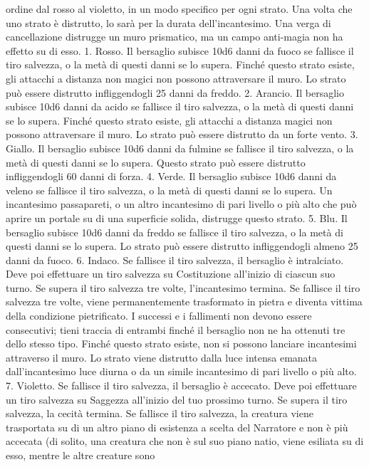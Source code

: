 \begin{multicols}{2}
ordine dal rosso al violetto, in un modo specifico per
ogni strato. Una volta che uno strato è distrutto, lo sarà
per la durata dell’incantesimo. Una verga di
cancellazione distrugge un muro prismatico, ma un
campo anti-magia non ha effetto su di esso.
1. Rosso. Il bersaglio subisce 10d6 danni da fuoco se
fallisce il tiro salvezza, o la metà di questi danni se lo
supera. Finché questo strato esiste, gli attacchi a
distanza non magici non possono attraversare il muro. 
Lo strato può essere distrutto infliggendogli 25 danni da
freddo.
2. Arancio. Il bersaglio subisce 10d6 danni da acido se
fallisce il tiro salvezza, o la metà di questi danni se lo
supera. Finché questo strato esiste, gli attacchi a
distanza magici non possono attraversare il muro. Lo
strato può essere distrutto da un forte vento.
3. Giallo. Il bersaglio subisce 10d6 danni da fulmine se
fallisce il tiro salvezza, o la metà di questi danni se lo
supera. Questo strato può essere distrutto infliggendogli
60 danni di forza.
4. Verde. Il bersaglio subisce 10d6 danni da veleno se
fallisce il tiro salvezza, o la metà di questi danni se lo
supera. Un incantesimo passapareti, o un altro
incantesimo di pari livello o più alto che può aprire un
portale su di una superficie solida, distrugge questo
strato.
5. Blu. Il bersaglio subisce 10d6 danni da freddo se
fallisce il tiro salvezza, o la metà di questi danni se lo
supera. Lo strato può essere distrutto infliggendogli
almeno 25 danni da fuoco.
6. Indaco. Se fallisce il tiro salvezza, il bersaglio è
intralciato. Deve poi effettuare un tiro salvezza su
Costituzione all’inizio di ciascun suo turno. Se supera il
tiro salvezza tre volte, l’incantesimo termina. Se fallisce
il tiro salvezza tre volte, viene permanentemente
trasformato in pietra e diventa vittima della condizione
pietrificato. I successi e i fallimenti non devono essere
consecutivi; tieni traccia di entrambi finché il bersaglio
non ne ha ottenuti tre dello stesso tipo.
Finché questo strato esiste, non si possono lanciare
incantesimi attraverso il muro. Lo strato viene distrutto
dalla luce intensa emanata dall’incantesimo luce diurna
o da un simile incantesimo di pari livello o più alto.
7. Violetto. Se fallisce il tiro salvezza, il bersaglio è
accecato. Deve poi effettuare un tiro salvezza su
Saggezza all’inizio del tuo prossimo turno. Se supera il
tiro salvezza, la cecità termina. Se fallisce il tiro
salvezza, la creatura viene trasportata su di un altro
piano di esistenza a scelta del Narratore e non è più accecata
(di solito, una creatura che non è sul suo piano natio,
viene esiliata su di esso, mentre le altre creature sono

\end{multicols}
